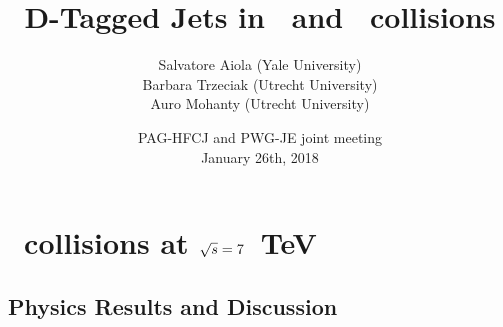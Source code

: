 \documentclass[xcolor={usenames,dvipsnames}, aspectratio=169]{beamer}
\title[D-Tagged Jets in \pp\ and \pPb] %
{D-Tagged Jets in \pp\ and \pPb\ collisions}
\author[Salvatore Aiola]%
{Salvatore Aiola (Yale University) \\
Barbara Trzeciak (Utrecht University) \\
Auro Mohanty (Utrecht University)
}
\institute[Yale University] %
{}
\date[Jan. 26th, 2018] %
{PAG-HFCJ and PWG-JE joint meeting\\
January 26th, 2018}
\begin{document}
\begin{frame}
  \titlepage
\end{frame}








\section{\pp\ collisions at $\sqrt{s}=7$~TeV}

\subsection{Physics Results and Discussion}
\end{document}

